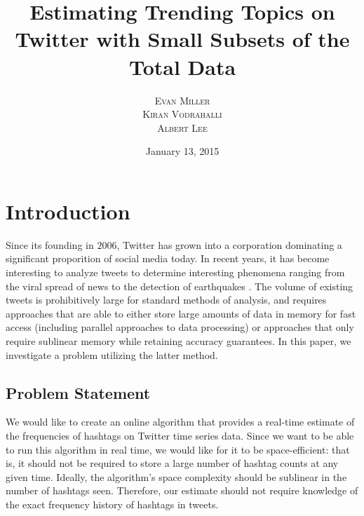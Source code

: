 \documentclass[twoside]{article}
\title{\vspace{-15mm}\fontsize{24pt}{10pt}\selectfont\textbf{Estimating Trending Topics on Twitter with Small Subsets of the Total Data}} %
\author{
\large
\textsc{Evan Miller}\\[2mm] 
\textsc{Kiran Vodrahalli}\\[2mm]
\textsc{Albert Lee}\\[2mm]
\vspace{-5mm}
}
\date{January 13, 2015}
\newcommand{\cc}[1]
 {\textbf{\cite{#1}}}
\begin{document}
\maketitle %


\begin{abstract}

\noindent \lipsum[1] %

\end{abstract}



\section{Introduction} \label{sec:Intro}

Since its founding in $2006$, Twitter has grown into a corporation dominating a significant
proporition of social media today. In recent years, it has become interesting to analyze tweets
to determine interesting phenomena ranging from the viral spread of news to the detection of earthquakes \cc{Burks:2014}. The volume of existing tweets is prohibitively large for standard methods of analysis, and requires approaches that are able to either store large amounts of data in memory for fast access (including parallel approaches to data processing) or approaches that only require sublinear memory while retaining accuracy guarantees. In this paper, we investigate a problem utilizing the latter method. 

\subsection{Problem Statement} 

We would like to create an online algorithm that provides a real-time estimate of the frequencies of hashtags on Twitter time series data.
Since we want to be able to run this algorithm in real time, we would like for it to be space-efficient: that is, it should not be required to store a large number of hashtag counts at any given time. Ideally, the algorithm's space complexity should be sublinear in the number of hashtags seen. 
Therefore, our estimate should not require knowledge of the exact frequency history of hashtags in tweets. 
\end{document}
